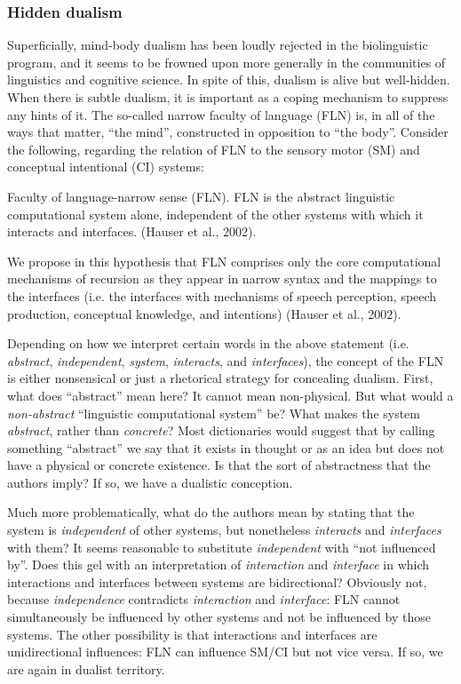 \subsubsection{Hidden dualism}

Superficially, mind-body dualism has been loudly rejected in the biolinguistic program, and it seems to be frowned upon more generally in the communities of linguistics and cognitive science. In spite of this, dualism is alive but well-hidden. When there is subtle dualism, it is important as a coping mechanism to suppress any hints of it. The so-called narrow faculty of language (FLN) is, in all of the ways that matter, “the mind”, constructed in opposition to “the body”. Consider the following, regarding the relation of FLN to the sensory motor (SM) and conceptual intentional (CI) systems:

Faculty of language-narrow sense (FLN). FLN is the abstract linguistic computational system alone, independent of the other systems with which it interacts and interfaces. (Hauser et al., 2002).

We   propose   in   this   hypothesis   that   FLN   comprises   only   the   core computational  mechanisms  of  recursion  as  they  appear  in  narrow  syntax  and  the mappings  to  the  interfaces (i.e.  the  interfaces  with  mechanisms  of  speech  perception, speech  production,  conceptual  knowledge,  and  intentions) (Hauser et al., 2002).

  Depending on how we interpret certain words in the above statement (i.e. \textit{abstract}, \textit{independent}, \textit{system}, \textit{interacts}, and \textit{interfaces}), the concept of the FLN is either nonsensical or just a rhetorical strategy for concealing dualism. First, what does “abstract” mean here? It cannot mean non-physical. But what would a \textit{non-abstract} “linguistic computational system” be? What makes the system \textit{abstract}, rather than \textit{concrete}? Most dictionaries would suggest that by calling something “abstract” we say that it exists in thought or as an idea but does not have a physical or concrete existence. Is that the sort of abstractness that the authors imply? If so, we have a dualistic conception. 

  Much more problematically, what do the authors mean by stating that the system is \textit{independent} of other systems, but nonetheless \textit{interacts} and \textit{interfaces} with them? It seems reasonable to substitute \textit{independent} with “not influenced by”. Does this gel with an interpretation of \textit{interaction} and \textit{interface} in which interactions and interfaces between systems are bidirectional? Obviously not, because \textit{independence} contradicts \textit{interaction} and \textit{interface}: FLN cannot simultaneously be influenced by other systems and not be influenced by those systems. The other possibility is that interactions and interfaces are unidirectional influences: FLN can influence SM/CI but not vice versa. If so, we are again in dualist territory. 

